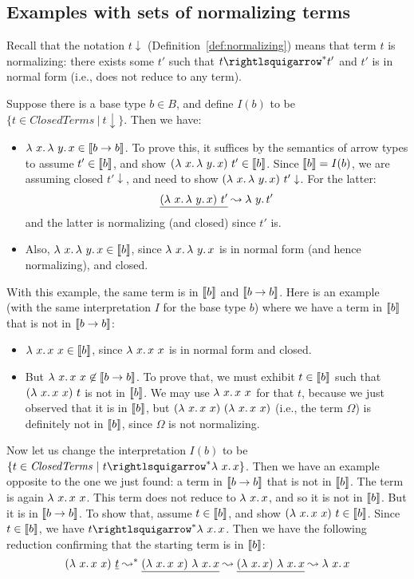 \subsection{Examples with sets of normalizing terms}

Recall that the notation $t \downarrow$
(Definition~\ref{def:normalizing}) means that term $t$ is normalizing:
there exists some $t'$ such that $t\betaa^* t'$ and $t'$ is in normal
form (i.e., does not reduce to any term).

Suppose there is a base type $b\in B$, and define $I(b)$ to be $\{t \in \textit{ClosedTerms}\ |\ t \downarrow\}$.
Then we have:

\begin{itemize}
\item $\lambda\ x.\, \lambda\ y.\, x \in \llbracket b \to b \rrbracket$.  To prove this, it suffices by the semantics
  of arrow types to assume $t'\in \llbracket b \rrbracket$, and
  show $(\lambda\ x.\, \lambda\ y.\, x)\ t' \in \llbracket b \rrbracket$.  Since $\llbracket b \rrbracket = I(b)$,
  we are assuming closed $t' \downarrow$, and need to show $(\lam{x}{\lam{y}{x}})\ t'\downarrow$.
  For the latter:
  \[
  \underline{(\lambda\ x.\, \lambda\ y.\, x)\ t'} \leadsto \lambda\ y.\, t'
  \]
  \noindent and the latter is normalizing (and closed) since $t'$ is.

\item Also, $\lambda\ x.\, \lambda\ y.\, x \in \llbracket b \rrbracket$, since $\lambda\ x.\, \lambda\ y.\, x$ is in normal
  form (and hence normalizing), and closed.

\end{itemize}

With this example, the same term is in $\llbracket b \rrbracket$ and $\llbracket b \to b \rrbracket$.  Here is an example (with the same interpretation $I$ for the base type $b$) where we have a term in $\llbracket b \rrbracket$ that is not in $\llbracket b \to b \rrbracket$:
\begin{itemize}
\item $\lambda\ x.\, x\ x \in \llbracket b \rrbracket$, since $\lambda\ x.\, x\ x$ is in normal form and closed.
\item But $\lambda\ x.\, x\ x \not\in \llbracket b \to b \rrbracket$.  To prove that, we must exhibit $t \in \llbracket b \rrbracket$ such
  that $(\lambda\ x.\, x\ x)\ t$ is not in $\llbracket b \rrbracket$.  We may use $\lambda\ x.\, x\ x$ for that $t$, because
  we just observed that it is in $\llbracket b \rrbracket$, but $(\lambda\ x.\, x\ x)\ (\lambda\ x.\, x\ x)$ (i.e., the term $\Omega$) is definitely
  not in $\llbracket b \rrbracket$, since $\Omega$ is not normalizing.
\end{itemize}

Now let us change the interpretation $I(b)$ to be $\{ t \in\textit{ClosedTerms}\ |\ t \betaa^* \lam{x}{x}\}$.  Then we
have an example opposite to the one we just found: a term in $\llbracket b\to b \rrbracket$ that is not in $\llbracket b \rrbracket$.
The term is again $\lambda\ x.\, x\ x$.  This term does not reduce to $\lambda\ x.\, x$, and so it is not in $\llbracket b \rrbracket$.
But it is in $\llbracket b \to b \rrbracket$.  To show that, assume $t\in\llbracket b \rrbracket$, and show $(\lambda\ x.\, x\ x)\ t\in\llbracket b \rrbracket$.
Since $t\in\llbracket b \rrbracket$, we have $t\betaa^*\lam{x}{x}$.  Then we have the following reduction confirming
that the starting term is in $\llbracket b \rrbracket$:
\[
(\lambda\ x.\, x\ x)\ \underline{t} \leadsto^* \underline{(\lambda\ x.\, x\ x)\ \lambda\ x.\, x} \leadsto \underline{(\lambda\ x.\, x)\ \lambda\ x.\, x} \leadsto \lambda\ x.\, x
\]


